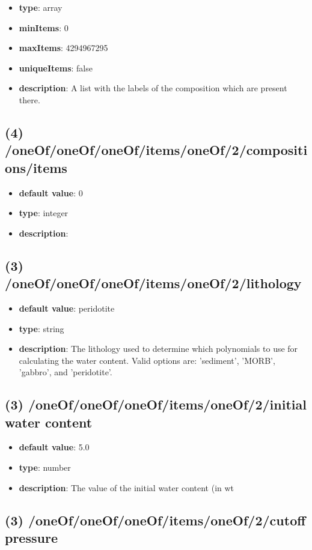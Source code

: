 \begin{itemize}[leftmargin=3em]\item {\bf type}: array
\item {\bf minItems}: 0
\item {\bf maxItems}: 4294967295
\item {\bf uniqueItems}: false
\item {\bf description}: A list with the labels of the composition which are present there.
\end{itemize}\subsection{(4) /oneOf/oneOf/oneOf/items/oneOf/2/compositions/items}
\begin{itemize}[leftmargin=4em]\item {\bf default value}: 0
\item {\bf type}: integer
\item {\bf description}: 
\end{itemize}\subsection{(3) /oneOf/oneOf/oneOf/items/oneOf/2/lithology}
\begin{itemize}[leftmargin=3em]\item {\bf default value}: peridotite
\item {\bf type}: string
\item {\bf description}: The lithology used to determine which polynomials to use for calculating the water content. Valid options are: 'sediment', 'MORB', 'gabbro', and 'peridotite'.
\end{itemize}\subsection{(3) /oneOf/oneOf/oneOf/items/oneOf/2/initial water content}
\begin{itemize}[leftmargin=3em]\item {\bf default value}: 5.0
\item {\bf type}: number
\item {\bf description}: The value of the initial water content (in wt%
\end{itemize}\subsection{(3) /oneOf/oneOf/oneOf/items/oneOf/2/cutoff pressure}
